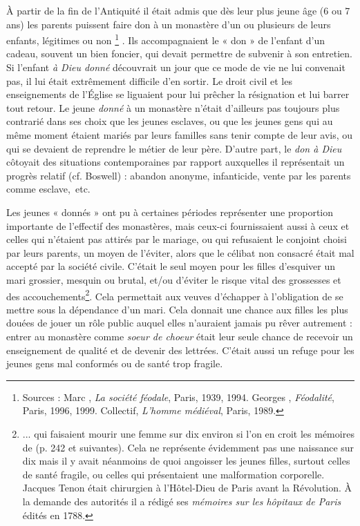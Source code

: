  À partir de  la fin de l'Antiquité il était admis que dès leur plus jeune âge (6 ou 7 ans) les parents puissent faire don à un monastère d'un ou plusieurs de leurs enfants, légitimes ou non%
\footnote{Sources : Marc , \emph{La société féodale}, Paris, 1939, 1994. Georges , \emph{Féodalité}, Paris, 1996, 1999. Collectif, \emph{L'homme médiéval}, Paris, 1989.}%
. Ils accompagnaient le « don » de l'enfant d'un cadeau, souvent un bien foncier, qui devait permettre de subvenir à son entretien. Si l'enfant \emph{à Dieu donné} découvrait un jour que ce mode de vie ne lui convenait pas, il lui était extrêmement difficile d'en sortir. Le droit civil et les enseignements de l'Église se liguaient pour lui prêcher la résignation et lui barrer tout retour. Le jeune \emph{donné} à un monastère n'était d'ailleurs pas toujours plus contrarié dans ses choix que les jeunes esclaves, ou que les jeunes gens qui au même moment étaient mariés par leurs familles sans tenir compte de leur avis, ou qui se devaient de reprendre le métier de leur père. D'autre part, le \emph{don à Dieu} côtoyait des situations contemporaines par rapport auxquelles il représentait un progrès relatif (cf. {Boswell}) : abandon anonyme, infanticide, vente par les parents comme esclave,~etc. 


Les jeunes « donnés » ont pu à certaines périodes représenter une proportion importante de l'effectif des monastères, mais ceux-ci fournissaient aussi à ceux et celles qui n'étaient pas attirés par le mariage, ou qui refusaient le conjoint choisi par leurs parents, un moyen de l'éviter, alors que le célibat non consacré était mal accepté par la société civile. C'était le seul moyen pour les filles d'esquiver un mari grossier, mesquin ou brutal, et/ou d'éviter le risque vital des grossesses et des accouchements\footnote{... qui faisaient mourir une femme sur dix environ si l'on en croit les mémoires de  (p. 242 et suivantes). Cela ne représente évidemment pas une naissance sur dix mais il y avait néanmoins de quoi angoisser les jeunes filles, surtout celles de santé fragile, ou celles qui présentaient une malformation corporelle. Jacques Tenon était chirurgien à l'Hôtel-Dieu de Paris avant la Révolution. À la demande des autorités il a rédigé ses \emph{mémoires sur les hôpitaux de Paris} édités en 1788.}. Cela permettait aux veuves d'échapper à l'obligation de se mettre sous la dépendance d'un mari. Cela donnait une chance aux filles les plus douées de jouer un rôle public auquel elles n'auraient jamais pu rêver autrement : entrer au monastère comme \emph{soeur de choeur} était leur seule chance de recevoir un enseignement de qualité et de devenir des lettrées. C'était aussi un refuge pour les jeunes gens mal conformés ou de santé trop fragile. 

